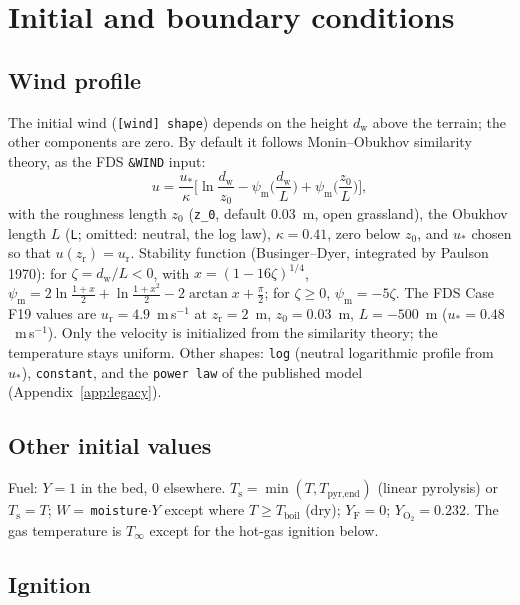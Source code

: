 \documentclass[11pt,a4paper]{article}
\newcommand{\code}[1]{\texttt{#1}}
\newcommand{\Yf}{Y_\text{F}}
\newcommand{\YO}{Y_{\mathrm{O_2}}}
\begin{document}
\section{Initial and boundary conditions}\label{sec:ibc}

\subsection{Wind profile}
The initial wind (\code{[wind] shape}) depends on the height $d_\text{w}$ above the terrain; the other
components are zero. By default it follows Monin--Obukhov similarity theory, as the FDS \code{\&WIND}
input:
\begin{equation}
  u = \frac{u_*}{\kappa}\Big[\ln\frac{d_\text{w}}{z_0} - \psi_\text{m}\Big(\frac{d_\text{w}}{L}\Big) + \psi_\text{m}\Big(\frac{z_0}{L}\Big)\Big],
\end{equation}
with the roughness length $z_0$ (\code{z\_0}, default 0.03~m, open grassland), the Obukhov length $L$
(\code{L}; omitted: neutral, the log law), $\kappa=0.41$, zero below $z_0$, and $u_*$ chosen so that
$u(z_\text{r})=u_\text{r}$. Stability function (Businger--Dyer, integrated by Paulson 1970): for $\zeta=d_\text{w}/L<0$,
with $x=(1-16\zeta)^{1/4}$, $\psi_\text{m}=2\ln\frac{1+x}{2}+\ln\frac{1+x^2}{2}-2\arctan x+\frac{\pi}{2}$; for
$\zeta\ge0$, $\psi_\text{m}=-5\zeta$. The FDS Case F19 values are $u_\text{r}=4.9$~m\,s$^{-1}$ at $z_\text{r}=2$~m,
$z_0=0.03$~m, $L=-500$~m ($u_*=0.48$~m\,s$^{-1}$). Only the velocity is initialized from the
similarity theory; the temperature stays uniform. Other shapes: \code{log} (neutral logarithmic
profile from $u_*$), \code{constant}, and the \code{power law} of the published model
(Appendix~\ref{app:legacy}).

\subsection{Other initial values}
Fuel: $Y=1$ in the bed, $0$ elsewhere. $T_\text{s}=\min(T,T_\text{pyr,end})$ (linear pyrolysis) or $T_\text{s}=T$;
$W=$\,\code{moisture}$\cdot Y$ except where $T\ge T_\text{boil}$ (dry); $\Yf=0$; $\YO=0.232$. The gas
temperature is $T_\infty$ except for the hot-gas ignition below.

\subsection{Ignition}\label{sec:ignition}
\end{document}
